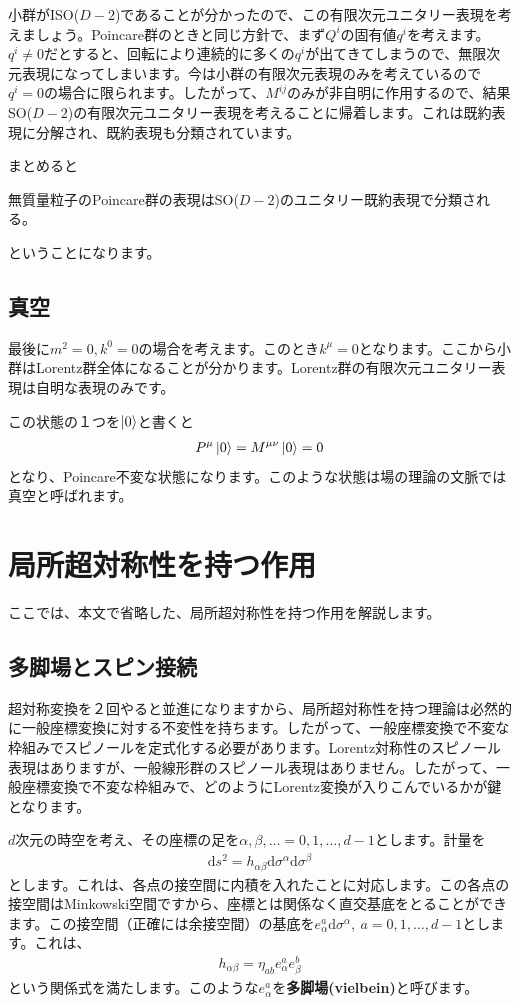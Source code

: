\documentclass[report,paper=a4, fontsize=12pt, line_length=16cm, number_of_lines=34,dvipdfmx]{jlreq}
\newenvironment{important}{\begin{tcolorbox}[
  colback = white,
  colframe = red!35,
  boxrule = 2mm,
  fonttitle = \bfseries,
  after = \noindent] }{\end{tcolorbox}}
\numberwithin{equation}{chapter}
\numberwithin{equation}{section}
\newcommand{\kyou}[1]{{\sffamily \bfseries #1}}
\newcommand{\di}{\mathrm{d}}
\begin{document}
小群がISO($D-2$)であることが分かったので、この有限次元ユニタリー表現を考えましょう。Poincare群のときと同じ方針で、まず$Q^i$の固有値$q^i$を考えます。$q^i\ne 0$だとすると、回転により連続的に多くの$q^i$が出てきてしまうので、無限次元表現になってしまいます。今は小群の有限次元表現のみを考えているので$q^{i}=0$の場合に限られます。したがって、$M^{ij}$のみが非自明に作用するので、結果SO($D-2$)の有限次元ユニタリー表現を考えることに帰着します。これは既約表現に分解され、既約表現も分類されています。

まとめると
\begin{important}
  無質量粒子のPoincare群の表現はSO($D-2$)のユニタリー既約表現で分類される。
\end{important}
ということになります。


\section{真空}
最後に$m^2=0,k^{0}=0$の場合を考えます。このとき$k^{\mu}=0$となります。ここから小群はLorentz群全体になることが分かります。Lorentz群の有限次元ユニタリー表現は自明な表現のみです。

この状態の１つを$\ket{0}$と書くと
\begin{align}
  P^{\mu}\ket{0}=M^{\mu\nu}\ket{0}=0
\end{align}
となり、Poincare不変な状態になります。このような状態は場の理論の文脈では真空と呼ばれます。

\chapter{局所超対称性を持つ作用}
\label{app:localSUSY}
ここでは、本文で省略した、局所超対称性を持つ作用を解説します。

\section{多脚場とスピン接続}
超対称変換を２回やると並進になりますから、局所超対称性を持つ理論は必然的に一般座標変換に対する不変性を持ちます。したがって、一般座標変換で不変な枠組みでスピノールを定式化する必要があります。Lorentz対称性のスピノール表現はありますが、一般線形群のスピノール表現はありません。したがって、一般座標変換で不変な枠組みで、どのようにLorentz変換が入りこんでいるかが鍵となります。

$d$次元の時空を考え、その座標の足を$\alpha,\beta,\dots=0,1,\dots,d-1$とします。計量を
\begin{align}
  \di s^2 = h_{\alpha\beta} \di \sigma^{\alpha}\di \sigma^{\beta}
\end{align}
とします。これは、各点の接空間に内積を入れたことに対応します。この各点の接空間はMinkowski空間ですから、座標とは関係なく直交基底をとることができます。この接空間（正確には余接空間）の基底を$e^{a}_{\alpha}\di \sigma^{\alpha}, \ a=0,1,\dots,d-1$とします。これは、
\begin{align}
  h_{\alpha\beta}=\eta_{ab}e^{a}_{\alpha}e^{b}_{\beta}\label{vielbein}
\end{align}
という関係式を満たします。このような$e^{a}_{\alpha}$を\kyou{多脚場(vielbein)}と呼びます。
\end{document}
